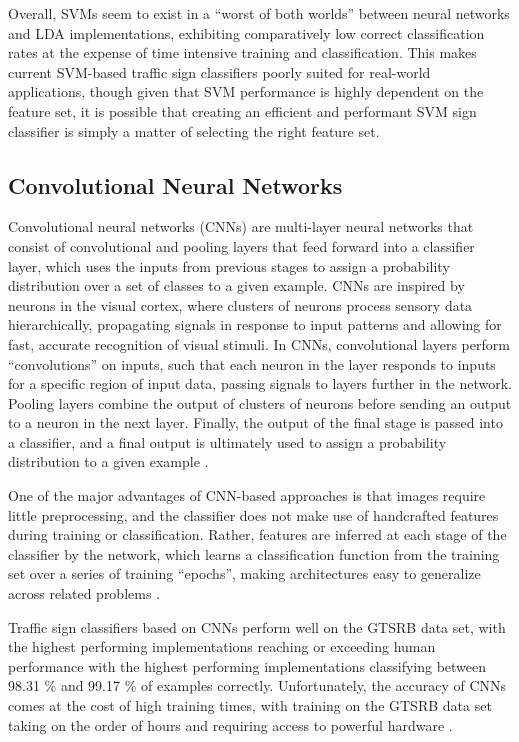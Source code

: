 \documentclass[letterpaper,twocolumn,10pt]{article}
\begin{document}
Overall, SVMs seem to exist in a ``worst of both worlds'' between neural networks and LDA implementations, exhibiting comparatively low correct classification rates at the expense of time intensive training and classification. This makes current SVM-based traffic sign classifiers poorly suited for real-world applications, though given that SVM performance is highly dependent on the feature set, it is possible that creating an efficient and performant SVM sign classifier is simply a matter of selecting the right feature set.

\subsection{Convolutional Neural Networks}

Convolutional neural networks (CNNs) are multi-layer neural networks that consist of convolutional and pooling layers that feed forward into a classifier layer, which uses the inputs from previous stages to assign a probability distribution over a set of classes to a given example. CNNs are inspired by neurons in the visual cortex, where clusters of neurons process sensory data hierarchically, propagating signals in response to input patterns and allowing for fast, accurate recognition of visual stimuli. In CNNs, convolutional layers perform ``convolutions'' on inputs, such that each neuron in the layer responds to inputs for a specific region of input data, passing signals to layers further in the network. Pooling layers combine the output of clusters of neurons before sending an output to a neuron in the next layer. Finally, the output of the final stage is passed into a classifier, and a final output is ultimately used to assign a probability distribution to a given example \cite{ciresan_committee_2011, ciresan_multi-column_2012, sermanet_convolutional_2012, sermanet_traffic_2011}. 

One of the major advantages of CNN-based approaches is that images require little preprocessing, and the classifier does not make use of handcrafted features during training or classification. Rather, features are inferred at each stage of the classifier by the network, which learns a classification function from the training set over a series of training ``epochs'', making architectures easy to generalize across related problems \cite{sermanet_convolutional_2012, sermanet_traffic_2011, stallkamp_german_2011, stallkamp_man_2012}. 

Traffic sign classifiers based on CNNs perform well on the GTSRB data set, with the highest performing implementations reaching or exceeding human performance with the highest performing implementations  classifying between 98.31 \% and 99.17 \% of examples correctly. Unfortunately, the accuracy of CNNs comes at the cost of high training times, with training on the GTSRB data set taking on the order of hours and requiring access to powerful hardware \cite{sermanet_convolutional_2012, sermanet_traffic_2011, stallkamp_german_2011, stallkamp_man_2012}. 
\end{document}
